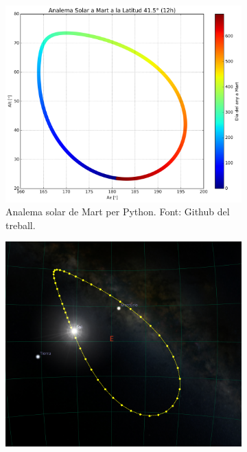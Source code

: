 \documentclass[a4paper, 11pt]{article}
\begin{document}
\begin{figure}[h!]
    \centering
    \begin{subfigure}{0.45\textwidth}
        \centering
        \includegraphics[width=\textwidth]{images/analema_Mart.png}
        \caption{Analema solar de Mart per Python. Font: Github del treball.}
    \end{subfigure}
    \hspace{0.05\textwidth}
    \begin{subfigure}{0.45\textwidth}
        \centering
        \includegraphics[width=\textwidth]{images/stellarium_mart_12.png}

\end{subfigure}
\end{figure}
\end{document}
